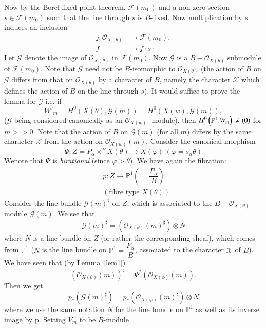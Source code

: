 \begin{Proof}
Now by the Borel fixed point theorem, $\mathscr{F}(m_0)$ and a non-zero section $s\in \mathscr{F}(m_0)$ such that the line through $s$ is $B$-fixed. Now multiplication by $s$ induces an inclusion 
$$
\begin{aligned}
j:\mathscr{O}_{X(\theta)}&\to \mathscr{F}(m_0),\\
f&\to f\cdot s \cdot
\end{aligned}
$$ 
Let $\mathscr{G}$ denote the image of $\mathscr{O}_{X(\theta)}$ in $\mathscr{F}(m_0)$. Now $\mathscr{G}$ is a $B-\mathscr{O}_{X(\theta)}$ submodule of $\mathscr{F}(m_0)$. Note that $\mathscr{G}$ need not be $B$-isomorphic to $\mathscr{O}_{X(\theta)}$ (the action of $B$ on $\mathscr{G}$ differs from that on $\mathscr{O}_{X(\theta)}$ by a character of $B$, namely  the character $\mathcal{X}$ which defines the action of $B$ on the line through $s$). It would suffice to prove the lemma for $\mathscr{G}$ i.e. if 
$$
W'_m=H^{0}(X(\theta), \mathscr{G}(m))=H^{0}(X(w), \mathscr{G}(m)),  
$$
($\mathscr{G}$ being considered canonically as an $\mathscr{O}_{X(w)}$ -module), then $H^{0}\left(\mathbb{P}^{1}. W_m\right)\\\neq (0)$ for $m>>0$. Note that the action of $B$ on $\mathscr{G}(m)$ (for all $m$) differs by the same character $\mathcal{X}$ from the action on $\mathscr{O}_{X(w)}(m)$. 
Consider the canonical morphism 
$$
\Psi: Z=P_{\alpha}\times ^{B} X(\theta)\to X(\varphi)~(\varphi=s_{\alpha}\theta)
$$
We\pageoriginale note that $\Psi$ is \textit{birational} (since $\varphi > \theta$). We have again the fibration: 
$$
\begin{aligned}
&p:Z\to \mathbb{P}^{1}\left(=\dfrac{P_{\alpha}}{B}\right)\\
&(\text{fibre type } X(\theta))
\end{aligned}
$$
Consider the line bundle $\mathscr{G}(m)^{\sharp}$ on $Z$, which is associated to the $B-\mathscr{O}_{X(\theta)}$ -module $\mathscr{G}(m)$. We see that 
$$
\mathscr{G}(m)^{\sharp}=\left(\mathscr{O}_{X(\theta)}(m)^{\sharp}\right)\otimes N
$$
where $N$ is a line bundle on $Z$ (or rather the corresponding sheaf), which comes from $\mathbb{P}^{1}$ ($N$ is the line bundle on $\mathbb{P}^{1}=\dfrac{P_{\alpha}}{B}$, associated to the character $\mathcal{X}$ of $B$). We have seen that (by Lemma~\ref{lem1})
$$
\left(\mathscr{O}_{X(\theta)}(m)\right)^{\sharp}=\Psi^{\ast}\left(\mathscr{O}_{X(\phi)}(m)\right). 
$$
Then we get
$$
p_{\ast}\left(\mathscr{G}(m)^{\sharp}\right)=p_{\ast}\left(\mathscr{O}_{X(\varphi)}(m)^{\sharp}\right)\otimes N
$$ 
where we use the same notation $N$ for the line bundle on $\mathbb{P}^{1}$ as well as its inverse image by p. Setting $V_m$ to be $B$-module 

\end{Proof}
